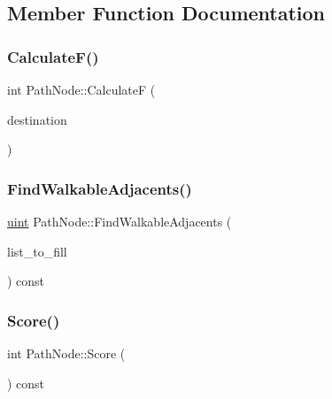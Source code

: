 \subsection{Member Function Documentation}
\mbox{\label{struct_path_node_ab7dec4b7f3c35b0ea6188884fe6b1859}} 
\subsubsection{\texorpdfstring{CalculateF()}{CalculateF()}}
{\footnotesize\ttfamily int Path\+Node\+::\+CalculateF (\begin{DoxyParamCaption}\item[{const pair$<$ int, int $>$ \&}]{destination }\end{DoxyParamCaption})}

\mbox{\label{struct_path_node_ae6a1d0ee4c3bc067ac41478feb367ce2}} 
\subsubsection{\texorpdfstring{FindWalkableAdjacents()}{FindWalkableAdjacents()}}
{\footnotesize\ttfamily \mbox{\hyperlink{_defs_8h_a91ad9478d81a7aaf2593e8d9c3d06a14}{uint}} Path\+Node\+::\+Find\+Walkable\+Adjacents (\begin{DoxyParamCaption}\item[{\mbox{\hyperlink{struct_path_list}{Path\+List}} \&}]{list\+\_\+to\+\_\+fill }\end{DoxyParamCaption}) const}

\mbox{\label{struct_path_node_ac9ab212cdf4e4fd2fa50143cd94869da}} 
\subsubsection{\texorpdfstring{Score()}{Score()}}
{\footnotesize\ttfamily int Path\+Node\+::\+Score (\begin{DoxyParamCaption}{ }\end{DoxyParamCaption}) const}



